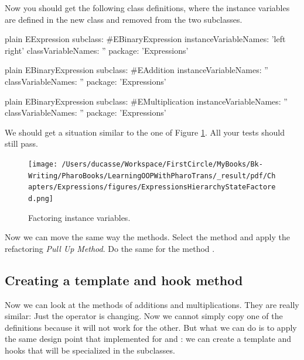 \documentclass[10pt,twoside,english]{_support/latex/sbabook/sbabook}
\begin{document}
Now you should get the following class definitions, where the instance variables are defined in the new class and removed from the two subclasses. 

\begin{displaycode}{plain}
EExpression subclass: #EBinaryExpression
	instanceVariableNames: 'left right'
	classVariableNames: ''
	package: 'Expressions'
\end{displaycode}

\begin{displaycode}{plain}
EBinaryExpression subclass: #EAddition
	instanceVariableNames: ''
	classVariableNames: ''
	package: 'Expressions'
\end{displaycode}

\begin{displaycode}{plain}
EBinaryExpression subclass: #EMultiplication
	instanceVariableNames: ''
	classVariableNames: ''
	package: 'Expressions'
\end{displaycode}

We should get a situation similar to the one of Figure \ref{figExpressionFactoredState}. All your tests should still pass. 


\begin{figure}

\begin{center}
\texttt{[image: /Users/ducasse/Workspace/FirstCircle/MyBooks/Bk-Writing/PharoBooks/LearningOOPWithPharoTrans/\_result/pdf/Chapters/Expressions/figures/ExpressionsHierarchyStateFactored.png]}\caption{Factoring instance variables.\label{figExpressionFactoredState}}\end{center}
\end{figure}


Now we can move the same way the methods. Select the method  and apply the refactoring \textit{Pull Up Method}.  Do the same for the method . 
\subsection{Creating a template and hook method}
Now we can look at the methods  of additions and multiplications. They are really similar: Just the operator is changing. Now we cannot simply copy one of the definitions because it will not work for the other. But what we can do is to apply the same design point that implemented for  and : we can create a template and hooks that will be specialized in the subclasses. 
\end{document}
